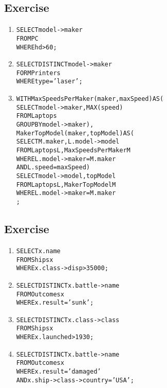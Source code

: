 \setcounter{subsection}{2}
\subsection*{Exercise \thesubsection}

\begin{enumerate}
\item
\begin{alltt}
SELECT model->maker
FROM   PC
WHERE  hd > 60;
\end{alltt}
\item
\begin{alltt}
SELECT DISTINCT model->maker
FORM   Printers
WHERE  type = 'laser';
\end{alltt}
\item
\begin{alltt}
WITH MaxSpeedsPerMaker(maker, maxSpeed) AS(
  SELECT   model->maker, MAX(speed)
  FROM     Laptops
  GROUP BY model->maker                  ),
MakerTopModel(maker,topModel) AS(
  SELECT M.maker, L.model->model
  FROM   Laptops L, MaxSpeedsPerMaker M
  WHERE  L.model->maker = M.maker
    AND  L.speed        = maxSpeed     )
SELECT model->model, topModel
FROM   Laptops L, MakerTopModel M
WHERE  L.model->maker = M.maker
;
\end{alltt}
\end{enumerate}

\setcounter{subsection}{3}
\subsection*{Exercise \thesubsection}

\begin{enumerate}
\item
\begin{alltt}
SELECT x.name
FROM   Ships x
WHERE  x.class->disp > 35000;
\end{alltt}
\item
\begin{alltt}
SELECT DISTINCT x.battle->name
FROM   Outcomes x
WHERE  x.result = 'sunk';
\end{alltt}
\item
\begin{alltt}
SELECT DISTINCT x.class->class
FROM   Ships x
WHERE  x.launched > 1930;
\end{alltt}
\item
\begin{alltt}
SELECT DISTINCT x.battle->name
FROM   Outcomes x
WHERE  x.result = 'damaged'
  AND  x.ship->class->country = 'USA';
\end{alltt}
\end{enumerate}

